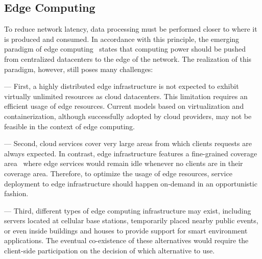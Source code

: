 \subsection{Edge Computing}

To reduce network latency, data processing must be performed closer to where it is produced and consumed. In accordance with this principle, the emerging paradigm of edge computing~\cite{} states that computing power should be pushed from centralized datacenters to the edge of the network. The realization of this paradigm, however, still poses many challenges:

%
--- First, a highly distributed edge infrastructure is not expected to exhibit virtually unlimited resources as cloud datacenters. This limitation requires an efficient usage of edge resources. Current models based on virtualization and containerization, although successfully adopted by cloud providers, may not be feasible in the context of edge computing.

--- Second, cloud services cover very large areas from which clients requests are always expected. In contrast, edge infrastructure features a fine-grained coverage area~\cite{Dehos14millimeter5g} where edge services would remain idle whenever no clients are in their coverage area. Therefore, to optimize the usage of edge resources, service deployment to edge infrastructure should happen on-demand in an opportunistic fashion. 


--- Third, different types of edge computing infrastructure may exist, including servers located at cellular base stations, temporarily placed nearby public events, or even inside buildings and houses to provide support for smart environment applications. The eventual co-existence of these alternatives would require the client-side participation on the decision of which alternative to use.




